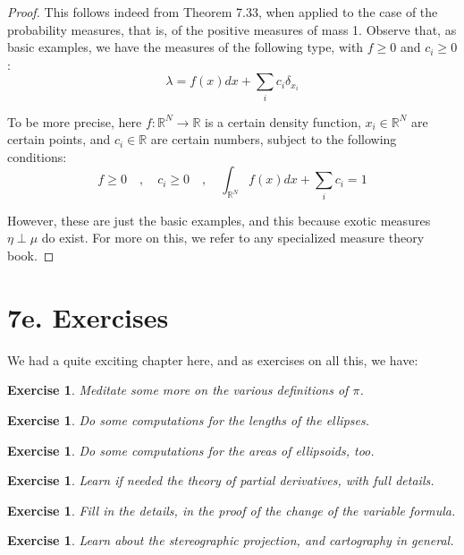 \documentclass[12pt]{amsbook}
\newtheorem{exercise}[theorem]{Exercise}
\begin{document}
\begin{proof}
This follows indeed from Theorem 7.33, when applied to the case of the probability measures, that is, of the positive measures of mass 1. Observe that, as basic examples, we have the measures of the following type, with $f\geq0$ and $c_i\geq0$:
$$\lambda=f(x)dx+\sum_ic_i\delta_{x_i}$$

To be more precise, here $f:\mathbb R^N\to\mathbb R$ is a certain density function, $x_i\in\mathbb R^N$ are certain points, and $c_i\in\mathbb R$ are certain numbers, subject to the following conditions:
$$f\geq 0\quad,\quad c_i\geq 0\quad,\quad \int_{\mathbb R^N}f(x)dx+\sum_ic_i=1$$

However, these are just the basic examples, and this because exotic measures $\eta\perp\mu$ do exist. For more on this, we refer to any specialized measure theory book.
\end{proof}


\section*{7e. Exercises}

We had a quite exciting chapter here, and as exercises on all this, we have:

\begin{exercise}
Meditate some more on the various definitions of $\pi$.
\end{exercise}

\begin{exercise}
Do some computations for the lengths of the ellipses.
\end{exercise}

\begin{exercise}
Do some computations for the areas of ellipsoids, too.
\end{exercise}

\begin{exercise}
Learn if needed the theory of partial derivatives, with full details.
\end{exercise}

\begin{exercise}
Fill in the details, in the proof of the change of the variable formula.
\end{exercise}

\begin{exercise}
Learn about the stereographic projection, and cartography in general.
\end{exercise}
\end{document}
